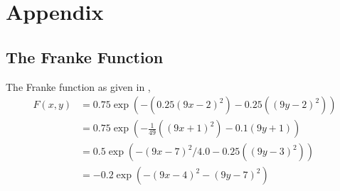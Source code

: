 \documentclass[11pt]{article}
\begin{document}
\section{Appendix} \label{sec:appendix}
\subsection{The Franke Function}
The Franke function as given in \cite{franke1979critical},
\begin{align}
    F(x,y) &= 0.75\exp\left(-\left(0.25\left(9x-2\right)^2\right) - 0.25\left(\left(9y-2\right)^2\right)\right) \\
    &= 0.75\exp\left(-\frac{1}{49}\left(\left(9x+1\right)^2\right) - 0.1\left(9y+1\right)\right) \\
    &= 0.5\exp\left(-\left(9x-7\right)^2/4.0 - 0.25\left(\left(9y-3\right)^2\right)\right) \\
    &= -0.2\exp\left(-\left(9x-4\right)^2 - \left(9y-7\right)^2\right)
    \label{eq:franke_function}
\end{align}



\end{document}
